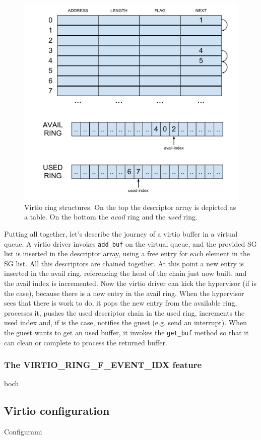 \begin{figure}[bt]
\centering
\includegraphics[scale = 0.48]{vring.pdf}
\caption{Virtio ring structures. On the top the descriptor array is depicted as a table. On the bottom the \emph{avail} ring and the 
	 \emph{used} ring.}
\label{fig:vring}
\end{figure}

\vspace{0.5cm}

Putting all together, let's describe the journey of a virtio buffer in a virtual queue. A virtio driver invokes \texttt{add\_buf} on the
virtual queue, and the provided SG list is inserted in the descriptor array, using a free entry for each element in the SG list. All this
descriptors are chained together. At this point a new entry is inserted in the avail ring, referencing the head of the chain just now
built, and the avail index is incremented.
Now the virtio driver can kick the hypervisor (if is the case), because there is a new entry in the avail ring.
When the hypervisor sees that there is work to do, it pops the new entry from the available ring, processes it, pushes the used descriptor
chain in the used ring, increments the used index and, if is the case, notifies the guest (e.g. send an interrupt). When the guest wants 
to get an used buffer, it invokes the \texttt{get\_buf} method so that it can clean or complete to process the returned buffer.


\subsubsection{The VIRTIO\_RING\_F\_EVENT\_IDX feature}
boch


\subsection{Virtio configuration}
Configurami
